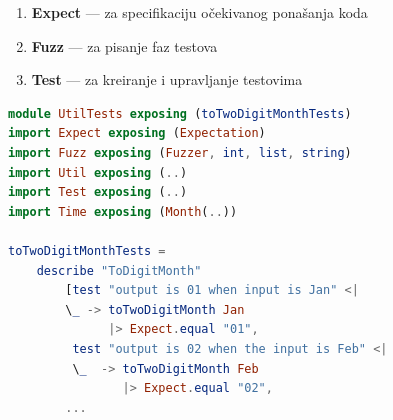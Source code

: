 \documentclass[12pt,oneside]{memoir}
\begin{document}
\begin{enumerate}
\item \textbf{Expect} --- za specifikaciju očekivanog ponašanja koda
\item \textbf{Fuzz} --- za pisanje faz testova 
\item \textbf{Test} --- za kreiranje i upravljanje testovima
\end{enumerate}

\begin{lstlisting}[language=elm, caption={Implementacija testova za funkciju \emph{toTwoDigitMonth}},captionpos=b, label={lst:example}]
module UtilTests exposing (toTwoDigitMonthTests)
import Expect exposing (Expectation)
import Fuzz exposing (Fuzzer, int, list, string)
import Util exposing (..)
import Test exposing (..)
import Time exposing (Month(..))

toTwoDigitMonthTests = 
    describe "ToDigitMonth" 
        [test "output is 01 when input is Jan" <|
        \_ -> toTwoDigitMonth Jan
              |> Expect.equal "01", 
         test "output is 02 when the input is Feb" <|
         \_  -> toTwoDigitMonth Feb
                |> Expect.equal "02",
        ... 
\end{lstlisting}
\end{document}
